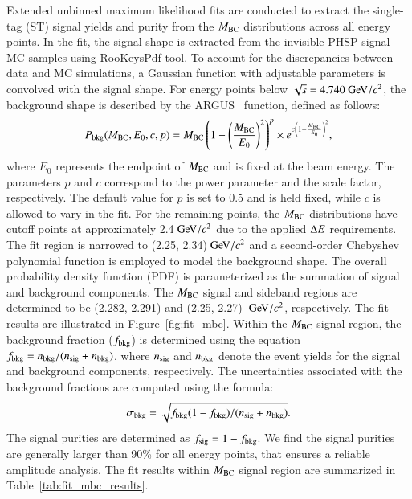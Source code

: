 Extended unbinned maximum likelihood fits are conducted to extract the single-tag (ST) signal yields and purity from the $M_{\rm{BC}}$ distributions across all energy points. In the fit, %
the signal shape is extracted from the invisible PHSP signal MC samples using RooKeysPdf tool. To account for the discrepancies between data and MC simulations, a Gaussian function with adjustable parameters is convolved with the signal shape. For energy points below $\sqrt{s} = 4.740\gev/c^2$, the background shape is described by the ARGUS~\cite{Djouadi:1989hh} function, defined as follows:
\begin{equation}
P_{\rm bkg}(M_{\rm{BC}},E_0,c,p) = M_{\rm{BC}} \left(1 - \left(\frac{M_{\rm{BC}}}{E_0}\right)^2 \right)^p \times e^{c \left(1-\frac{M_{\rm{BC}}}{E_0}\right)^2},
\end{equation}
where $E_0$ represents the endpoint of $M_{\rm{BC}}$ and is fixed at the beam energy. The parameters $p$ and $c$ correspond to the power parameter and the scale factor, respectively. The default value for $p$ is set to 0.5 and is held fixed, while $c$ is allowed to vary in the fit. For the remaining points, the $M_{\rm{BC}}$ distributions have cutoff points at approximately 2.4$\gev/c^2$ due to the applied $\Delta E$ requirements.
The fit region is narrowed to (2.25, 2.34)$\gev/c^2$ and a second-order Chebyshev polynomial function is employed to model the background shape. The overall probability density function (PDF) is parameterized as the summation of signal and background components. The $M_{\rm{BC}}$ signal and sideband regions are determined to be (2.282, 2.291) and (2.25, 2.27) $\gev/c^2$, respectively. The fit results are illustrated in Figure~\ref{fig:fit_mbc}. Within the $M_{\rm{BC}}$ signal region, the background fraction ($f_{\rm bkg}$) is determined using the equation $f_{\rm bkg} = n_{\rm bkg}/(n_{\rm sig} + n_{\rm bkg})$, where $n_{\rm sig}$ and $n_{\rm bkg}$ denote the event yields for the signal and background components, respectively. 
The uncertainties associated with the background fractions are computed using the formula:
\begin{equation}
   \sigma_{\rm bkg} = \sqrt{f_{\rm bkg}(1-f_{\rm bkg})/(n_{\rm sig} + n_{\rm bkg})}.
\end{equation}
The signal purities are determined as $f_{\rm sig} = 1 - f_{\rm bkg}$. We find the signal purities are generally larger than 90\% for all energy points, that ensures a reliable amplitude analysis. The fit results within $M_{\rm{BC}}$ signal region are summarized in Table~\ref{tab:fit_mbc_results}.

